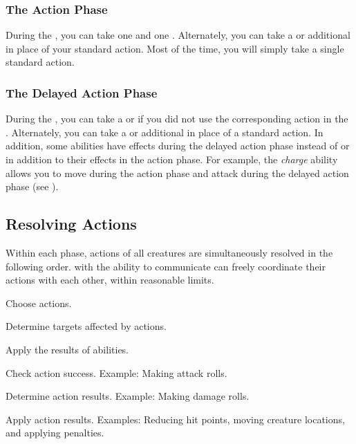         \subsubsection{The Action Phase}\label{The Action Phase}
            During the , you can take one  and one .
            Alternately, you can take a  or additional  in place of your standard action.
            Most of the time, you will simply take a single standard action.

        \subsubsection{The Delayed Action Phase}\label{The Delayed Action Phase}
            During the , you can take a  or  if you did not use the corresponding action in the .
            Alternately, you can take a  or additional  in place of a standard action.
            In addition, some abilities have effects during the delayed action phase instead of or in addition to their effects in the action phase.
            For example, the \textit{charge} ability allows you to move during the action phase and attack during the delayed action phase (see ).

    \subsection{Resolving Actions}\label{Resolving Actions}

        Within each phase, actions of all creatures are simultaneously resolved in the following order.
         with the ability to communicate can freely coordinate their actions with each other, within reasonable limits.

        \begin{enumerate*}
            \item Choose actions.
            \item Determine targets affected by actions.
            \item Apply the results of  abilities.
            \item Check action success.
                Example: Making attack rolls.
            \item Determine action results.
                Example: Making damage rolls.
            \item Apply action results.
                Examples: Reducing hit points, moving creature locations, and applying penalties.
        \end{enumerate*}

